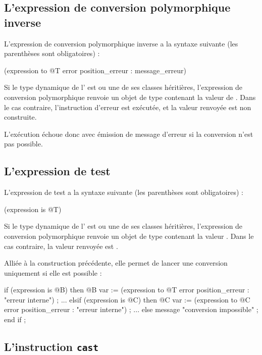 \subsection{L'expression de conversion polymorphique inverse}

L'expression de conversion polymorphique inverse a la syntaxe suivante (les parenthèses sont obligatoires) :

\begin{galgascode}
(expression to @T error position_erreur : message_erreur)
\end{galgascode}

Si le type dynamique de l' est  ou une de ses classes héritières, l'expression de conversion polymorphique renvoie un objet de type  contenant la valeur de . Dans le cas contraire, l'instruction d'erreur est exécutée, et la valeur renvoyée est non construite.

L'exécution échoue donc avec émission de message d'erreur si la conversion n'est pas possible. 

\subsection{L'expression de test}

L'expression de test a la syntaxe suivante (les parenthèses sont obligatoires) :

\begin{galgascode}
(expression is @T)
\end{galgascode}

Si le type dynamique de l'  est  ou une de ses classes héritières, l'expression de conversion polymorphique renvoie un objet de type  contenant la valeur . Dans le cas contraire, la valeur renvoyée est .

Alliée à la construction précédente, elle permet de lancer une conversion uniquement si elle est possible :

\begin{galgascode}
if (expression is @B) then
  @B var := (expression to @T error position_erreur : "erreur interne") ;
  ...
elsif (expression is @C) then
  @C var := (expression to @C error position_erreur : "erreur interne") ;
  ...
else
  message "conversion impossible" ;
end if ;
\end{galgascode}

\subsection{L'instruction \texttt{cast}}

